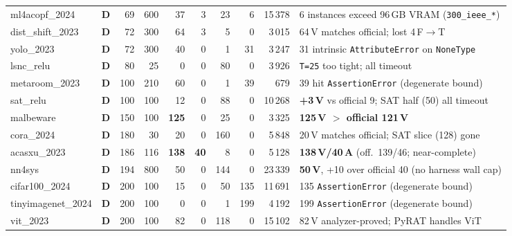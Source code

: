 \documentclass[10pt]{beamer}
\newcommand{\sdone}{{\color{cdone}\textbf{D}}}
\begin{document}
\begin{frame}[fragile]
\begin{tabular}{l c r r r r r r r l}
ml4acopf\_2024                    & \sdone & 69    & 600     & 37           & 3           & 23    & 6   & 15\,378 & 6 instances exceed 96\,GB VRAM (\texttt{300\_ieee\_*}) \\
dist\_shift\_2023                 & \sdone & 72    & 300     & 64           & 3           & 5     & 0   & 3\,015  & 64\,V matches official; lost 4\,F$\to$T \\
yolo\_2023                        & \sdone & 72    & 300     & 40           & 0           & 1     & 31  & 3\,247  & 31 intrinsic \texttt{AttributeError} on \texttt{NoneType} \\
lsnc\_relu                        & \sdone & 80    & 25      & 0            & 0           & 80    & 0   & 3\,926  & \texttt{T=25} too tight; all timeout \\
metaroom\_2023                    & \sdone & 100   & 210     & 60           & 0           & 1     & 39  & 679     & 39 hit \texttt{AssertionError} (degenerate bound) \\
sat\_relu                         & \sdone & 100   & 100     & 12           & 0           & 88    & 0   & 10\,268 & \textbf{+3\,V} vs official 9; SAT half (50) all timeout \\
malbeware                         & \sdone & 150   & 100     & \textbf{125} & 0           & 25    & 0   & 3\,325  & \textbf{125\,V $>$ official 121\,V} \\
cora\_2024                        & \sdone & 180   & 30      & 20           & 0           & 160   & 0   & 5\,848  & 20\,V matches official; SAT slice (128) gone \\
acasxu\_2023                      & \sdone & 186   & 116     & \textbf{138} & \textbf{40} & 8     & 0   & 5\,128  & \textbf{138\,V/40\,A} (off.\ 139/46; near-complete) \\
nn4sys                            & \sdone & 194   & 800     & 50           & 0           & 144   & 0   & 23\,339 & \textbf{50\,V}, +10 over official 40 (no harness wall cap) \\
cifar100\_2024                    & \sdone & 200   & 100     & 15           & 0           & 50    & 135 & 11\,691 & 135 \texttt{AssertionError} (degenerate bound) \\
tinyimagenet\_2024                & \sdone & 200   & 100     & 0            & 0           & 1     & 199 & 4\,192  & 199 \texttt{AssertionError} (degenerate bound) \\
vit\_2023                         & \sdone & 200   & 100     & 82           & 0           & 118   & 0   & 15\,102 & 82\,V analyzer-proved; PyRAT handles ViT \\

\end{tabular}
\end{frame}
\end{document}
